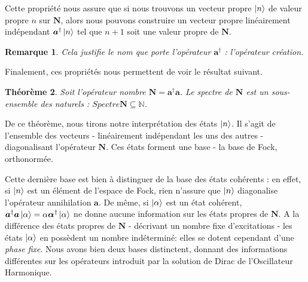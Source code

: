 \documentclass[11pt,oneside,a4paper]{article}
\newtheorem{theorem}{Théorème}[section]
\newtheorem{remark}[theorem]{Remarque}
\begin{document}
Cette propriété nous assure que si nous trouvons un vecteur propre $\ket{n}$ de valeur propre $n$ sur $\bm{N}$, alors nous pouvons construire un vecteur propre linéairement indépendant $\bm{a}^\dagger\ket{n}$ tel que $n+1$ soit une valeur propre de $\bm{N}$.
\begin{remark}
  Cela justifie le nom que porte l'opérateur $\bm{a}^\dagger$ : l'opérateur création.
\end{remark}
Finalement, ces propriétés nous permettent de voir le résultat suivant.
\begin{theorem}
  Soit l'opérateur nombre $\bm{N} = \bm{a}^\dagger\bm{a}$. Le spectre de $\bm{N}$ est un sous-ensemble des naturels : $Spectre \bm{N}\subseteq\mathbb{N}$.
\end{theorem}

De ce théorème, nous tirons notre interprétation des états $\ket{n}$. Il s'agit de l'ensemble des vecteurs - linéairement indépendant les uns des autres - diagonalisant l'opérateur $\bm{N}$. Ces états forment une base - la base de Fock, orthonormée. 

Cette dernière base est bien à distinguer de la base des états cohérents : en effet, si $\ket{n}$ est un élément de l'espace de Fock, rien n'assure que $\ket{n}$ diagonalise l'opérateur annihilation $\bm{a}$. De même, si $\ket{\alpha}$ est un état cohérent, $\bm{a}^\dagger \bm{a}\ket{\alpha} = \alpha \bm{\alpha}^\dagger\ket{\alpha}$ ne donne aucune information sur les états propres de $\bm{N}$. A la différence des états propres de $\bm{N}$ - décrivant un nombre fixe d'excitations - les états $\ket{\alpha}$ en possèdent un nombre indéterminé: elles se dotent cependant d'une \emph{phase fixe}. Nous avons bien deux bases distinctent, donnant des informations différentes sur les opérateurs introduit par la solution de Dirac de l'Oscillateur Harmonique.\\
\end{document}
